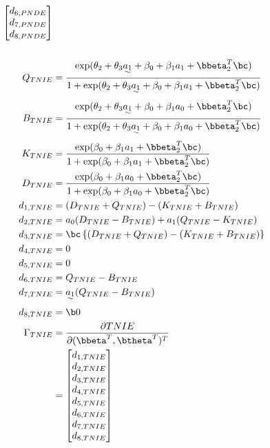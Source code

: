 \documentclass[10pt]{article}
\begin{document}
\begin{align*}
\begin{bmatrix}
      d_{6,PNDE}\\
      d_{7,PNDE}\\
      d_{8,PNDE}\\
    \end{bmatrix}\\
  \\
  Q_{TNIE} &= \frac
      {    \exp(\theta_{2} + \theta_{3}\uwave{a_{1}} + \beta_{0} + \beta_{1}a_{1} + \bbeta_{2}^{T}\bc)}
      {1 + \exp(\theta_{2} + \theta_{3}\uwave{a_{1}} + \beta_{0} + \beta_{1}a_{1} + \bbeta_{2}^{T}\bc)}\\
  B_{TNIE} &= \frac
      {    \exp(\theta_{2} + \theta_{3}\uwave{a_{1}} + \beta_{0} + \beta_{1}a_{0} + \bbeta_{2}^{T}\bc)}
      {1 + \exp(\theta_{2} + \theta_{3}\uwave{a_{1}} + \beta_{0} + \beta_{1}a_{0} + \bbeta_{2}^{T}\bc)}\\
  K_{TNIE} &= \frac
      {    \exp(\beta_{0} + \beta_{1}a_{1} + \bbeta_{2}^{T}\bc)}
      {1 + \exp(\beta_{0} + \beta_{1}a_{1} + \bbeta_{2}^{T}\bc)}\\
  D_{TNIE} &= \frac
      {    \exp(\beta_{0} + \beta_{1}a_{0} + \bbeta_{2}^{T}\bc)}
      {1 + \exp(\beta_{0} + \beta_{1}a_{0} + \bbeta_{2}^{T}\bc)}\\
  d_{1,TNIE} &= (D_{TNIE} + Q_{TNIE}) - (K_{TNIE} + B_{TNIE})\\
  d_{2,TNIE} &= a_{0}(D_{TNIE} - B_{TNIE}) + a_{1}(Q_{TNIE} - K_{TNIE})\\
  d_{3,TNIE} &= \bc \left\{ (D_{TNIE} + Q_{TNIE}) - (K_{TNIE} + B_{TNIE}) \right\}\\
  d_{4,TNIE} &= 0\\
  d_{5,TNIE} &= 0\\
  d_{6,TNIE} &= Q_{TNIE} - B_{TNIE}\\
  d_{7,TNIE} &= \uwave{a_{1}} (Q_{TNIE} - B_{TNIE})\\
  d_{8,TNIE} &= \b0\\
  \Gamma_{TNIE}
  &= \frac{\partial TNIE}{\partial (\bbeta^{T},\btheta^{T})^{T}}\\
  &= \begin{bmatrix}
      d_{1,TNIE}\\
      d_{2,TNIE}\\
      d_{3,TNIE}\\
      d_{4,TNIE}\\
      d_{5,TNIE}\\
      d_{6,TNIE}\\
      d_{7,TNIE}\\
      d_{8,TNIE}\\
    \end{bmatrix}\\

\end{align*}
\end{document}
